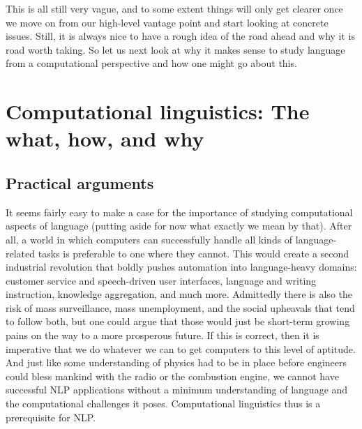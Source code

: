 
This is all still very vague, and to some extent things will only get clearer once we move on from our high-level vantage point and start looking at concrete issues.
Still, it is always nice to have a rough idea of the road ahead and why it is road worth taking.
So let us next look at why it makes sense to study language from a computational perspective and how one might go about this.


\section{Computational linguistics: The what, how, and why}

\subsection{Practical arguments}

It seems fairly easy to make a case for the importance of studying computational aspects of language (putting aside for now what exactly we mean by that). 
After all, a world in which computers can successfully handle all kinds of language-related tasks is preferable to one where they cannot.
This would create a second industrial revolution that boldly pushes automation into language-heavy domains: customer service and speech-driven user interfaces, language and writing instruction, knowledge aggregation, and much more.
Admittedly there is also the risk of mass surveillance, mass unemployment, and the social upheavals that tend to follow both, but one could argue that those would just be short-term growing pains on the way to a more prosperous future.
If this is correct, then it is imperative that we do whatever we can to get computers to this level of aptitude.
And just like some understanding of physics had to be in place before engineers could bless mankind with the radio or the combustion engine, we cannot have successful NLP applications without a minimum understanding of language and the computational challenges it poses.
Computational linguistics thus is a prerequisite for NLP\@.

